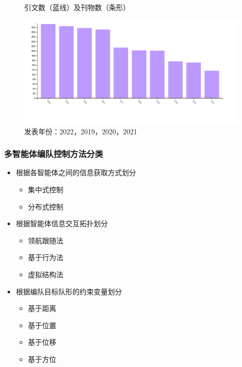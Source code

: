 \documentclass{beamer}
\theoremstyle{remark}
\begin{document}
\begin{frame}
\begin{figure}[htbp]
\begin{minipage}[c]{0.5\textwidth}
			\caption{引文数（蓝线）及刊物数（条形）}
		\end{minipage}%
		\begin{minipage}[c]{0.5\textwidth}
			\centering
			\includegraphics[width=0.8\linewidth]{Fig/formation Control of multi agent _year.jpg}
			\caption{发表年份：2022，2019，2020，2021}
		\end{minipage}
	\end{figure}	
\end{frame}

\begin{frame}
	\frametitle{多智能体编队控制方法分类}
	\begin{itemize}
		\item 根据各智能体之间的信息获取方式划分
		\begin{itemize}
			\item 集中式控制
			\item 分布式控制
		\end{itemize}
		\item 根据智能体信息交互拓扑划分
		\begin{itemize}
			\item 领航跟随法
			\item 基于行为法
			\item 虚拟结构法
		\end{itemize} 
		\item 根据编队目标队形的约束变量划分
		\begin{itemize}
			\item 基于距离 
			\item 基于位置
			\item 基于位移
			\item 基于方位
		\end{itemize}  
	\end{itemize}
\end{frame}
\end{document}
